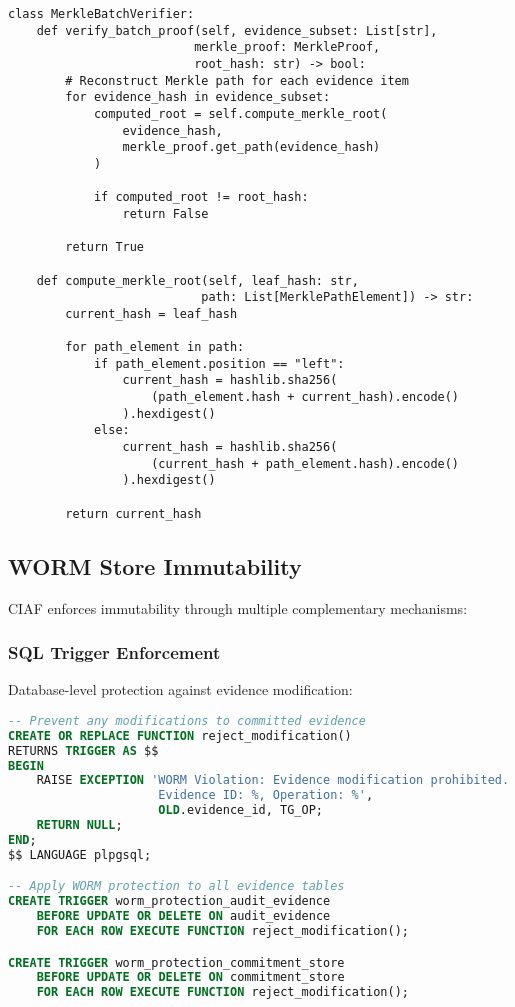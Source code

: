 \documentclass[12pt,a4paper]{article}
\begin{document}
\begin{lstlisting}[caption=Merkle Batch Verification]
class MerkleBatchVerifier:
    def verify_batch_proof(self, evidence_subset: List[str], 
                          merkle_proof: MerkleProof, 
                          root_hash: str) -> bool:
        # Reconstruct Merkle path for each evidence item
        for evidence_hash in evidence_subset:
            computed_root = self.compute_merkle_root(
                evidence_hash, 
                merkle_proof.get_path(evidence_hash)
            )
            
            if computed_root != root_hash:
                return False
        
        return True
    
    def compute_merkle_root(self, leaf_hash: str, 
                           path: List[MerklePathElement]) -> str:
        current_hash = leaf_hash
        
        for path_element in path:
            if path_element.position == "left":
                current_hash = hashlib.sha256(
                    (path_element.hash + current_hash).encode()
                ).hexdigest()
            else:
                current_hash = hashlib.sha256(
                    (current_hash + path_element.hash).encode()
                ).hexdigest()
        
        return current_hash
\end{lstlisting}

\subsection{WORM Store Immutability}

CIAF enforces immutability through multiple complementary mechanisms:

\subsubsection{SQL Trigger Enforcement}

Database-level protection against evidence modification:

\begin{lstlisting}[language=SQL, caption=WORM SQL Triggers]
-- Prevent any modifications to committed evidence
CREATE OR REPLACE FUNCTION reject_modification()
RETURNS TRIGGER AS $$
BEGIN
    RAISE EXCEPTION 'WORM Violation: Evidence modification prohibited. 
                     Evidence ID: %, Operation: %', 
                     OLD.evidence_id, TG_OP;
    RETURN NULL;
END;
$$ LANGUAGE plpgsql;

-- Apply WORM protection to all evidence tables
CREATE TRIGGER worm_protection_audit_evidence
    BEFORE UPDATE OR DELETE ON audit_evidence
    FOR EACH ROW EXECUTE FUNCTION reject_modification();

CREATE TRIGGER worm_protection_commitment_store  
    BEFORE UPDATE OR DELETE ON commitment_store
    FOR EACH ROW EXECUTE FUNCTION reject_modification();
\end{lstlisting}
\end{document}
